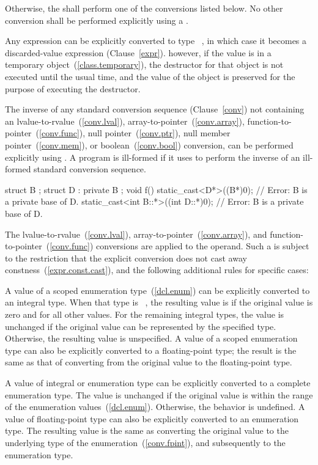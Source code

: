 \pnum
Otherwise, the  shall perform one of the conversions
listed below. No other conversion shall be performed explicitly using a
.

\pnum
Any expression can be explicitly converted to type \cv\
, in which case it becomes a discarded-value
expression (Clause~\ref{expr}).
\enternote 
however, if the value is in a temporary
object~(\ref{class.temporary}), the destructor for that
object is
not executed until the usual time, and the value of the object is
preserved for the purpose of executing the destructor.
\exitnote 


\pnum
The inverse of any standard conversion sequence (Clause~\ref{conv}) not containing an
lvalue-to-rvalue~(\ref{conv.lval}),
array-to-pointer~(\ref{conv.array}),
function-to-pointer~(\ref{conv.func}),
null pointer~(\ref{conv.ptr}), null member pointer~(\ref{conv.mem}), or
boolean~(\ref{conv.bool})
conversion, can be performed explicitly using . A
program is ill-formed if it uses \tcode{static_cast} to perform the
inverse of an ill-formed standard conversion sequence.
\enterexample
\begin{codeblock}
struct B { };
struct D : private B { };
void f() {
  static_cast<D*>((B*)0);               // Error: B is a private base of D.
  static_cast<int B::*>((int D::*)0);   // Error: B is a private base of D.
}
\end{codeblock}
\exitexample

\pnum
The lvalue-to-rvalue~(\ref{conv.lval}),
array-to-pointer~(\ref{conv.array}), and
function-to-pointer~(\ref{conv.func}) conversions are applied to the
operand. Such a \tcode{static_cast} is subject to the restriction that
the explicit conversion does not cast away
constness~(\ref{expr.const.cast}), and the following additional rules
for specific cases:

\pnum
A value of a scoped enumeration type~(\ref{dcl.enum}) can be explicitly converted to an
integral type. When that type is \cv\ \tcode{bool}, the resulting value is
\tcode{false} if the original value is zero and \tcode{true} for all other
values. For the remaining integral types, the value is unchanged if the
original value can be represented by the
specified type. Otherwise, the resulting value is unspecified.
A value of a scoped enumeration type can also be explicitly converted to a
floating-point type; the result is the same as that of converting from the original
value to the floating-point type.

\pnum
{}%
%
A value of integral or enumeration type can be explicitly converted to
a complete enumeration type. The value is unchanged if the original value is
within the range of the enumeration values~(\ref{dcl.enum}). Otherwise,
the behavior is undefined.
A value of floating-point type can also be explicitly converted to an enumeration type.
The resulting value is the same as converting the original value to the
underlying type of the enumeration~(\ref{conv.fpint}), and subsequently to
the enumeration type.

